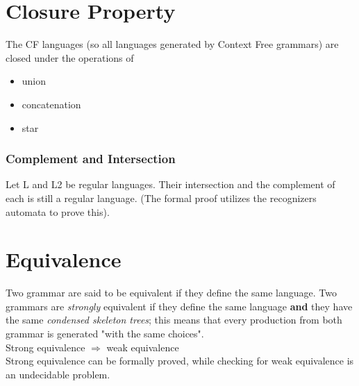 \documentclass[10pt,a4paper]{article}
\begin{document}
		\section{Closure Property}
			The CF languages (so all languages generated by Context Free grammars) are closed under the operations of
			\begin{itemize}
				\item union
				\item concatenation
				\item star
			\end{itemize}
			
			\subsubsection{Complement and Intersection}
				Let L and L2 be regular languages. Their intersection and the complement of each is still a regular language. (The formal proof utilizes the recognizers automata to prove this).
		
		\section{Equivalence}
			Two grammar are said to be equivalent if they define the same language. Two grammars are \emph{strongly} equivalent if they define the same language \textbf{and} they have the same \emph{condensed skeleton trees}; this means that every production from both grammar is generated "with the same choices".\\
			Strong equivalence $\Rightarrow$ weak equivalence\\
			Strong equivalence can be formally proved, while checking for weak equivalence is an undecidable problem.\\
\end{document}
